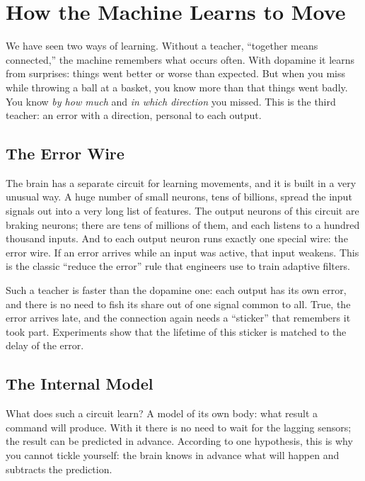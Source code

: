 \chapter{How the Machine Learns to Move}

We have seen two ways of learning. Without a teacher, ``together means connected,'' the machine remembers what occurs often. With dopamine it learns from surprises: things went better or worse than expected. But when you miss while throwing a ball at a basket, you know more than that things went badly. You know \emph{by how much} and \emph{in which direction} you missed. This is the third teacher: an error with a direction, personal to each output.

\section*{The Error Wire}

The brain has a separate circuit for learning movements, and it is built in a very unusual way. A huge number of small  neurons, tens of billions, spread the input signals out into a very long list of features. The output neurons of this circuit are braking  neurons; there are tens of millions of them, and each listens to a hundred thousand inputs. And to each output neuron runs exactly one special wire: the error wire. If an error arrives while an input was active, that input weakens. This is the classic ``reduce the error'' rule that engineers use to train adaptive filters.


Such a teacher is faster than the dopamine one: each output has its own error, and there is no need to fish its share out of one signal common to all. True, the error arrives late, and the connection again needs a ``sticker'' that remembers it took part. Experiments show that the lifetime of this sticker is matched to the delay of the error.

\section*{The Internal Model}

What does such a circuit learn? A model of its own body: what result a command will produce. With it there is no need to wait for the lagging sensors; the result can be predicted in advance. According to one hypothesis, this is why you cannot tickle yourself: the brain knows in advance what will happen and subtracts the prediction.

